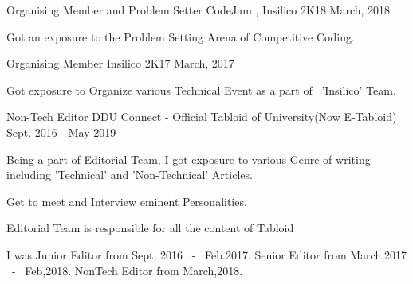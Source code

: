 


\begin{cventries}


\cventry
{Organising Member and Problem Setter} %
{CodeJam , Insilico 2K18} %
{March, 2018} %
{} %
{ %
\begin{cvitems}
\item {Got an exposure to the Problem Setting Arena of Competitive Coding.}
\end{cvitems}
}


\cventry
{Organising Member} %
{Insilico 2K17} %
{March, 2017} %
{} %
{ %
\begin{cvitems}
\item {Got exposure to Organize various Technical Event as a part of ~'Insilico' Team.}
\end{cvitems}
}


\cventry
{Non-Tech Editor} %
{DDU Connect - Official Tabloid of University(Now E-Tabloid)} %
{Sept. 2016 - May 2019} %
{} %
{ %
\begin{cvitems}
\item {Being a part of Editorial Team, I got exposure to various Genre of writing including 'Technical' and 'Non-Technical' Articles.}
\item {Get to meet and Interview eminent Personalities.}
\item {Editorial Team is responsible for all the content of Tabloid}
\item {I was Junior Editor from Sept, 2016 ~-~ Feb.2017. Senior Editor from March,2017 ~-~ Feb,2018. NonTech Editor from March,2018.}
\end{cvitems}
}


\end{cventries}
